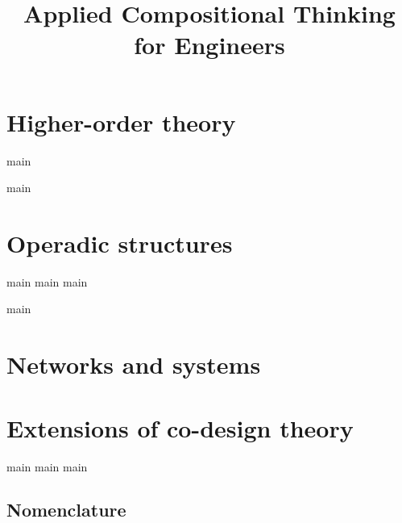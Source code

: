 \pagestyle{scrheadings}

\ohead{\pagemark}
\ihead{\headmark}
\cfoot{}
\dominitoc
\doparttoc
\setcounter{parttocdepth}{0}
\setcounter{minitocdepth}{1}

\title{Applied Compositional Thinking\\ for Engineers}
\date{}


\tableofcontents

\addtocounter{part}{8}
\addtocounter{chapter}{38}


\part{Higher-order theory}\label{part:higher-order}
\clearpage





{main}

{main}


\part{Operadic structures}\label{part:operads}


{main}
{main}
{main}

{main}


\part{Networks and systems}\label{part:networks}
\clearpage
{}

\chapter{}


\part{Extensions of co-design theory}
{main}
{main}
{main}


\printbibliography

\chapter*{Nomenclature}
\begin{small}

\end{small}

\printindex


